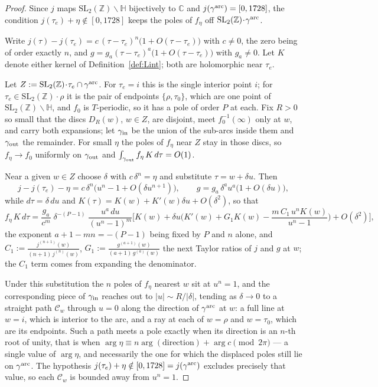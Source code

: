\documentclass[11pt]{article}
\newcommand{\HH}{\mathbb{H}}
\newcommand{\ZZ}{\mathbb{Z}}
\newcommand{\CC}{\mathbb{C}}
\newcommand{\SLZ}{\mathrm{SL}_2(\ZZ)}
\begin{document}
\begin{proof}
Since $j$ maps $\SLZ\backslash\HH$ bijectively to $\CC$ and $j(\gamma^{\rm arc})=[0,1728]$, the
condition $j(\tau_e)+\eta\notin[0,1728]$ keeps the poles of $f_\eta$ off
$\SLZ\!\cdot\!\gamma^{\rm arc}$.

Write $j(\tau)-j(\tau_e)=c\,(\tau-\tau_e)^{n}\big(1+O(\tau-\tau_e)\big)$ with $c\neq0$, the zero
being of order exactly $n$, and $g=g_a(\tau-\tau_e)^{a}\big(1+O(\tau-\tau_e)\big)$ with
$g_a\neq0$. Let $K$ denote either kernel of Definition~\ref{def:Lint}; both are holomorphic near
$\tau_e$.

Let $Z:=\SLZ\!\cdot\!\tau_e\cap\gamma^{\rm arc}$. For $\tau_e=i$ this is the single interior point
$i$; for $\tau_e\in\SLZ\!\cdot\!\rho$ it is the pair of endpoints $\{\rho,\tau_0\}$, which are one
point of $\SLZ\backslash\HH$, and $f_0$ is $T$-periodic, so it has a pole of order $P$ at each.
Fix $R>0$ so small that the discs $D_R(w)$, $w\in Z$, are disjoint, meet $f_0^{-1}(\infty)$ only at
$w$, and carry both expansions; let $\gamma_{\rm in}$ be the union of the sub-arcs inside them and
$\gamma_{\rm out}$ the remainder. For small $\eta$ the poles of $f_\eta$ near $Z$ stay in those
discs, so $f_\eta\to f_0$ uniformly on $\gamma_{\rm out}$ and
$\int_{\gamma_{\rm out}}f_\eta\,K\,d\tau=O(1)$.

Near a given $w\in Z$ choose $\delta$ with $c\,\delta^{n}=\eta$ and substitute $\tau=w+\delta u$.
Then
\begin{equation}\label{eq:ellscale}
j-j(\tau_e)-\eta=c\,\delta^{n}\big(u^{n}-1+O(\delta u^{n+1})\big),\qquad
g=g_a\,\delta^{a}u^{a}\big(1+O(\delta u)\big),
\end{equation}
while $d\tau=\delta\,du$ and $K(\tau)=K(w)+K'(w)\delta u+O(\delta^{2})$, so that
\begin{equation}\label{eq:ellmodel}
f_\eta\,K\,d\tau
=\frac{g_a}{c^{m}}\;\delta^{-(P-1)}\;\frac{u^{a}\,du}{(u^{n}-1)^{m}}
\Big[K(w)+\delta u\Big(K'(w)+G_1K(w)-\frac{m\,C_1\,u^{n}K(w)}{u^{n}-1}\Big)+O(\delta^{2})\Big],
\end{equation}
the exponent $a+1-mn=-(P-1)$ being fixed by $P$ and $n$ alone, and
$C_1:=\frac{j^{(n+1)}(w)}{(n+1)\,j^{(n)}(w)}$, $G_1:=\frac{g^{(a+1)}(w)}{(a+1)\,g^{(a)}(w)}$ the
next Taylor ratios of $j$ and $g$ at $w$; the $C_1$ term comes from expanding the denominator.

Under this substitution the $n$ poles of $f_\eta$ nearest $w$ sit at $u^{n}=1$, and the
corresponding piece of $\gamma_{\rm in}$ reaches out to $|u|\sim R/|\delta|$, tending as
$\delta\to0$ to a straight path $\mathcal{C}_w$ through $u=0$ along the direction of
$\gamma^{\rm arc}$ at $w$: a full line at $w=i$, which is interior to the arc, and a ray at each of
$w=\rho$ and $w=\tau_0$, which are its endpoints. Such a path meets a pole exactly when its
direction is
an $n$-th root of unity, that is when $\arg\eta\equiv n\arg(\text{direction})+\arg c\pmod{2\pi}$ ---
a single value of $\arg\eta$, and necessarily the one for which the displaced poles still lie on
$\gamma^{\rm arc}$. The hypothesis $j(\tau_e)+\eta\notin[0,1728]=j(\gamma^{\rm arc})$ excludes
precisely that value, so each $\mathcal{C}_w$ is bounded away from $u^{n}=1$.


\end{proof}
\end{document}
